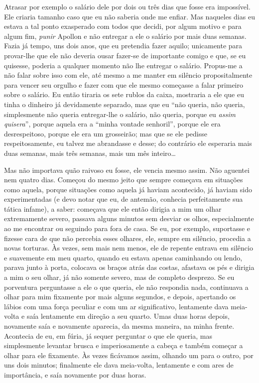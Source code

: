 Atrasar por exemplo o salário dele por dois ou três dias que fosse era
impossível. Ele criaria tamanho caso que eu não saberia onde me enfiar.
Mas naqueles dias eu estava a tal ponto exasperado com todos que
decidi, por algum motivo e para algum fim, \textit{punir} Apollon e não
entregar a ele o salário por mais duas semanas. Fazia já tempo, uns
dois anos, que eu pretendia fazer aquilo; unicamente para provar-lhe
que ele não deveria ousar fazer-se de importante comigo e que, se eu
quisesse, poderia a qualquer momento não lhe entregar o salário.
Propus-me a não falar sobre isso com ele, até mesmo a me manter em
silêncio propositalmente para vencer seu orgulho e fazer com que ele
mesmo começasse a falar primeiro sobre o salário. Eu então tiraria os
sete rublos da caixa, mostraria a ele que eu tinha o dinheiro já
devidamente separado, mas que eu “não queria, não queria, simplesmente
não queria entregar-lhe o salário, não queria, porque eu
\textit{assim quisera}”, porque aquela era a “minha
vontade senhoril”, porque ele era desrespeitoso, porque ele era um
grosseirão; mas que se ele pedisse respeitosamente, eu talvez me
abrandasse e desse; do contrário ele esperaria mais duas semanas, mais
três semanas, mais um mês inteiro\ldots{}

Mas não importava quão raivoso eu fosse, ele vencia mesmo assim. Não
aguentei nem quatro dias. Começou do mesmo jeito que sempre começava em
situações como aquela, porque situações como aquela já haviam
acontecido, já haviam sido experimentadas (e devo notar que eu, de
antemão, conhecia perfeitamente sua tática infame), a saber: começava
que ele então dirigia a mim um olhar extremamente severo, passava
alguns minutos sem desviar os olhos, especialmente ao me encontrar ou
seguindo para fora de casa. Se eu, por exemplo, suportasse e fizesse
cara de que não percebia esses olhares, ele, sempre em silêncio,
procedia a novas torturas. Às vezes, sem mais nem menos, ele de repente
entrava em silêncio e suavemente em meu quarto, quando eu estava apenas
caminhando ou lendo, parava junto à porta, colocava os braços atrás das
costas, afastava os pés e dirigia a mim o seu olhar, já não somente
severo, mas de completo desprezo. Se eu porventura perguntasse a ele o
que queria, ele não respondia nada, continuava a olhar para mim
fixamente por mais alguns segundos, e depois, apertando os lábios com
uma força peculiar e com um ar significativo, lentamente dava
meia-volta e saía lentamente em direção a seu quarto. Umas duas horas
depois, novamente saía e novamente aparecia, da mesma maneira, na minha
frente. Acontecia de eu, em fúria, já sequer perguntar o que ele
queria, mas simplesmente levantar brusca e imperiosamente a cabeça e
também começar a olhar para ele fixamente. Às vezes ficávamos assim,
olhando um para o outro, por uns dois minutos; finalmente ele dava
meia-volta, lentamente e com ares de importância, e saía novamente por
duas horas.

